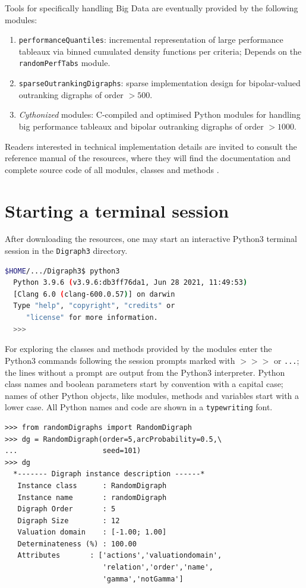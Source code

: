 \noindent Tools for specifically handling Big Data are eventually provided by the following modules:
\begin{enumerate}[leftmargin=0.75cm]
\item \texttt{performanceQuantiles}: incremental representation of large performance tableaux via binned cumulated density functions per criteria; Depends on the \texttt{randomPerfTabs} module.
\item \texttt{sparseOutrankingDigraphs}: sparse implementation design for bipolar-valued outranking digraphs of order $> 500$.
\item \emph{Cythonized} modules: C-compiled and optimised Python modules for handling big performance tableaux and bipolar outranking digraphs of order $> 1000$.
\end{enumerate}

Readers interested in technical implementation details are invited to consult the reference manual of the \Digraph resources, where they will find the documentation and complete source code of all \Digraph modules, classes and methods \citep{BIS-2021b}. 

\section{Starting a \Digraph terminal session}
\label{sec:1.3}
After downloading the \Digraph resources, one may start an interactive Python3 terminal session in the \texttt{Digraph3} directory.
\begin{lstlisting}[language=sh, backgroundcolor=\color{White}, numbers=none]
  $HOME/.../Digraph3$ python3
  Python 3.9.6 (v3.9.6:db3ff76da1, Jun 28 2021, 11:49:53) 
  [Clang 6.0 (clang-600.0.57)] on darwin
  Type "help", "copyright", "credits" or 
     "license" for more information.
  >>>
\end{lstlisting}

For exploring the classes and methods provided by the \Digraph modules enter the Python3 commands following the session prompts marked with $>>>$ or \texttt{...}; the lines without a prompt are output from the Python3 interpreter. Python class names and boolean parameters start by convention with a capital case; names of other Python objects, like modules, methods and variables start with a lower case. All Python names and code are shown in a \texttt{typewriting} font.
\begin{lstlisting}[caption={Generating a digraph instance},label=list:1.1]
>>> from randomDigraphs import RandomDigraph
>>> dg = RandomDigraph(order=5,arcProbability=0.5,\
...                    seed=101)
>>> dg
  *------- Digraph instance description ------*
   Instance class      : RandomDigraph
   Instance name       : randomDigraph
   Digraph Order       : 5
   Digraph Size        : 12
   Valuation domain    : [-1.00; 1.00]
   Determinateness (%) : 100.00
   Attributes       : ['actions','valuationdomain',
                       'relation','order','name',
                       'gamma','notGamma']
\end{lstlisting}

